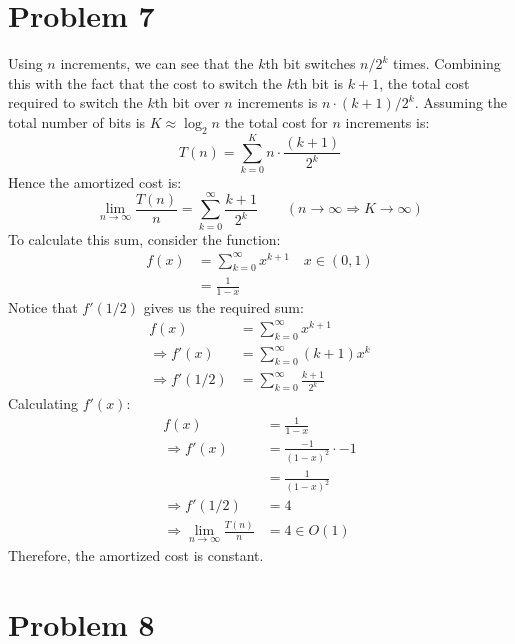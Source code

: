 \documentclass{article}
\begin{document}
\section{Problem 7}

  Using $n$ increments, we can see that the $k$th bit switches $n / 2^k$ times.
  Combining this with the fact that the cost to switch the $k$th bit is $k + 1$, the total cost required to switch the $k$th bit over $n$ increments is $n \cdot (k + 1) / 2^k$.
  Assuming the total number of bits is $K \approx \log_2 n$ the total cost for $n$ increments is:
  \[ T(n) = \sum_{k=0}^{K} n \cdot \frac{(k + 1)}{2^k} \]
  Hence the amortized cost is:
  \[
    \lim_{n \to \infty} \frac{T(n)}{n} = \sum_{k=0}^{\infty} \frac{k + 1}{2^k}
    \qquad (n \to \infty \Rightarrow K \to \infty)
  \]
  To calculate this sum, consider the function:
  \begin{align*}
    f(x) &= \sum_{k=0}^{\infty} x^{k+1} \quad x \in (0, 1) \\
    &= \frac{1}{1 - x}
  \end{align*}
  Notice that $f'(1/2)$ gives us the required sum:
  \begin{align*}
    f(x) &= \sum_{k=0}^{\infty} x^{k+1} \\
    \Rightarrow f'(x) &= \sum_{k=0}^{\infty} (k + 1) x^k \\
    \Rightarrow f'(1/2) &= \sum_{k=0}^{\infty} \frac{k + 1}{2^k}
  \end{align*}
  Calculating $f'(x)$:
  \begin{align*}
    f(x) &= \frac{1}{1 - x} \\
    \Rightarrow f'(x) &= \frac{-1}{(1 - x)^2} \cdot -1 \\
    &= \frac{1}{(1 - x)^2} \\
    \Rightarrow f'(1/2) &= 4 \\
    \Rightarrow \lim_{n \to \infty} \frac{T(n)}{n} &= 4 \in O(1)
  \end{align*}
  Therefore, the amortized cost is constant.

\section{Problem 8}
\end{document}
